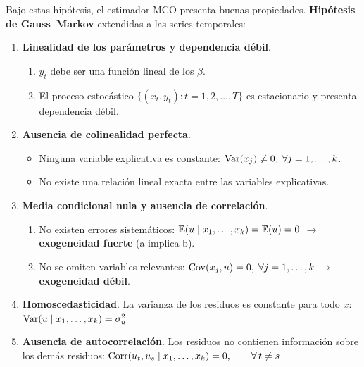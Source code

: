  \begin{f}
 	
 	Bajo estas hipótesis, el estimador MCO presenta buenas propiedades.
 	\textbf{Hipótesis de Gauss--Markov} extendidas a las series temporales:
 	
 	\begin{enumerate}[leftmargin=*, label=t\arabic{*}.]
 		
 		\item \textbf{Linealidad de los parámetros y dependencia débil}.
 		
 		\begin{enumerate}[leftmargin=*, label=\alph{*}.]
 			\item \(y_{t}\) debe ser una función lineal de los \(\beta\).
 			\item El proceso estocástico \(\lbrace(x_{t},y_{t}):t=1,2,\ldots,T\rbrace\) es estacionario y presenta dependencia débil.
 		\end{enumerate}
 		
 		\item \textbf{Ausencia de colinealidad perfecta}.
 		
 		\begin{itemize}[leftmargin=*]
 			\item Ninguna variable explicativa es constante: \(\mathrm{Var}(x_{j})\neq0,\;\forall j=1,\ldots,k\).
 			\item No existe una relación lineal exacta entre las variables explicativas.
 		\end{itemize}
 		
 		\item \textbf{Media condicional nula y ausencia de correlación}.
 		
 		\begin{enumerate}[leftmargin=*, label=\alph{*}.]
 		\item No existen errores sistemáticos: \(\mathbb{E}(u\mid x_{1},\ldots,x_{k})=\mathbb{E}(u)=0\) \(\rightarrow\) \textbf{exogeneidad fuerte} (a implica b).
 		\item No se omiten variables relevantes: \(\mathrm{Cov}(x_{j},u)=0,\;\forall j=1,\ldots,k\) \(\rightarrow\) \textbf{exogeneidad débil}.
 		\end{enumerate}
 		
 		\item \textbf{Homoscedasticidad}. La varianza de los residuos es constante para todo \(x\): \( \mathrm{Var}(u\mid x_{1},\ldots,x_{k})=\sigma^{2}_{u}\)
 		
 		\item \textbf{Ausencia de autocorrelación}. Los residuos no contienen información sobre los demás residuos: \( \mathrm{Corr}(u_t,u_s\mid x_{1},\ldots,x_{k})=0, \qquad \forall\, t\neq s\)
 		

\end{enumerate}
\end{f}
